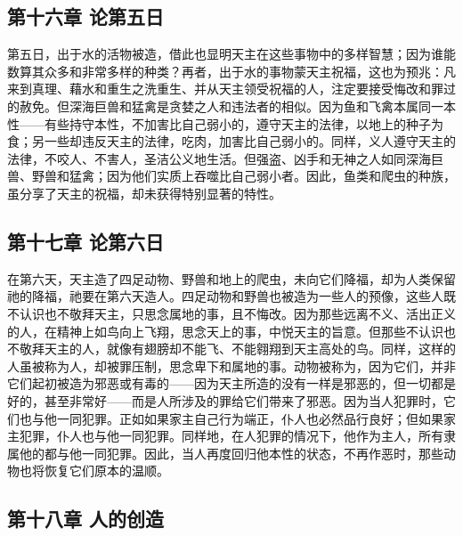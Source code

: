 
\subsection{第十六章 论第五日}

第五日，出于水的活物被造，借此也显明天主在这些事物中的多样智慧；因为谁能数算其众多和非常多样的种类？再者，出于水的事物蒙天主祝福，这也为预兆：凡来到真理、藉水和重生之洗重生、并从天主领受祝福的人，注定要接受悔改和罪过的赦免。但深海巨兽和猛禽是贪婪之人和违法者的相似。因为鱼和飞禽本属同一本性——有些持守本性，不加害比自己弱小的，遵守天主的法律，以地上的种子为食；另一些却违反天主的法律，吃肉，加害比自己弱小的。同样，义人遵守天主的法律，不咬人、不害人，圣洁公义地生活。但强盗、凶手和无神之人如同深海巨兽、野兽和猛禽；因为他们实质上吞噬比自己弱小者。因此，鱼类和爬虫的种族，虽分享了天主的祝福，却未获得特别显著的特性。\par


\subsection{第十七章 论第六日}

在第六天，天主造了四足动物、野兽和地上的爬虫，未向它们降福，却为人类保留祂的降福，祂要在第六天造人。四足动物和野兽也被造为一些人的预像，这些人既不认识也不敬拜天主，只思念属地的事，且不悔改。因为那些远离不义、活出正义的人，在精神上如鸟向上飞翔，思念天上的事，中悦天主的旨意。但那些不认识也不敬拜天主的人，就像有翅膀却不能飞、不能翱翔到天主高处的鸟。同样，这样的人虽被称为人，却被罪压制，思念卑下和属地的事。动物被称为，因为它们，并非它们起初被造为邪恶或有毒的——因为天主所造的没有一样是邪恶的，但一切都是好的，甚至非常好——而是人所涉及的罪给它们带来了邪恶。因为当人犯罪时，它们也与他一同犯罪。正如如果家主自己行为端正，仆人也必然品行良好；但如果家主犯罪，仆人也与他一同犯罪。同样地，在人犯罪的情况下，他作为主人，所有隶属他的都与他一同犯罪。因此，当人再度回归他本性的状态，不再作恶时，那些动物也将恢复它们原本的温顺。\par


\subsection{第十八章 人的创造}


